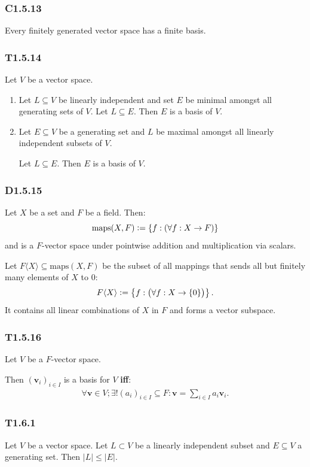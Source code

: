 \documentclass{article}
\newcommand{\deq}{\vcentcolon=}
\newcommand{\vc}[1]{\boldsymbol{#1}}
\begin{document}
\begin{multicols*}{3}
\subsubsection*{C1.5.13}
Every finitely generated vector space has a finite basis.

\subsubsection*{T1.5.14}
Let $V$ be a vector space.
\begin{enumerate}
    \item Let $L\subseteq V$ be linearly independent and
    set $E$ be minimal amongst all generating sets of $V$.
    Let $L\subseteq E$.
    Then $E$ is a basis of $V$.

    \item Let $E\subseteq V$ be a generating set and
    $L$ be maximal amongst all linearly independent
    subsets of $V$. 
    
    Let $L\subseteq E$. Then $E$ is a basis of $V$.
\end{enumerate}

\subsubsection*{D1.5.15}
Let $X$ be a set and $F$ be a field. Then:
$$\text{maps}(X,F)\deq\{f:(\forall f:X\rightarrow F)\}$$
and is a $F$-vector space under pointwise addition and
multiplication via scalars.

Let $F\langle X\rangle\subseteq\text{maps}(X,F)$ be
the subset of all mappings that sends all but finitely many
elements of $X$ to $0$:
$$F\langle X\rangle\deq
\left\{f:\bigl(\forall f:X\rightarrow\{0\}\bigr)\right\}.$$
It contains all linear combinations of $X$
in $F$ and forms a vector subspace.

\subsubsection*{T1.5.16}
Let $V$ be a $F$-vector space.

Then $(\vc{v}_i)_{i\in I}$ is a basis for $V$ \textbf{if{}f}:
\begin{align*}
    \forall\vc{v}\in V;\exists!(a_i)_{i\in I}\subseteq F:
    \vc{v}=\sum_{i\in I}a_i\vc{v}_i.
\end{align*}

\subsubsection*{T1.6.1}
Let $V$ be a vector space.
Let $L\subset V$ be a linearly independent subset
and $E\subseteq V$ a generating set.
Then $|L|\leq|E|$.


\end{multicols*}
\end{document}
